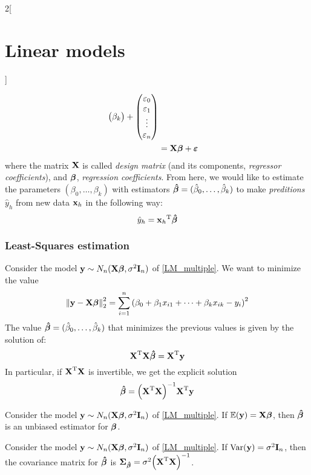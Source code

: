 \documentclass[../../../main_math.tex]{subfiles}
\begin{document}
\begin{multicols}{2}[\section{Linear models}]
\begin{definition}
\begin{align}
\begin{pmatrix}
                     \beta_k \\
                   \end{pmatrix}+
      \begin{pmatrix}
        \varepsilon_0 \\
        \varepsilon_1 \\
        \vdots        \\
        \varepsilon_n \\
      \end{pmatrix}                                                \\
      \label{LM_multiple}      & =\boldsymbol{\mathrm{X}}\boldsymbol{\mathrm{\beta}}+\boldsymbol{\mathrm{\varepsilon}}
    \end{align}
    where the matrix $\boldsymbol{\mathrm{X}}$ is called \emph{design matrix} (and its components, \emph{regressor coefficients}), and $\boldsymbol{\mathrm{\beta}}$, \emph{regression coefficients}. From here, we would like to estimate the parameters $(\beta_0,\ldots,\beta_k)$ with estimators $\boldsymbol{\mathrm{\hat\beta}}=(\hat\beta_0,\ldots,\hat\beta_k)$ to make \emph{preditions} $\hat{y}_h$ from new data $\boldsymbol{\mathrm{x}}_h$ in the following way: $$\hat{y}_h={\boldsymbol{\mathrm{x}}_h}^{\mathrm{T}}\boldsymbol{\mathrm{\hat\beta}}$$
  \end{definition}
  \subsubsection{Least-Squares estimation}
  \begin{proposition}
    Consider the model $\boldsymbol{\mathrm{y}}\sim N_n(\boldsymbol{\mathrm{X\beta}},\sigma^2\boldsymbol{\mathrm{I}}_n)$ of \cref{LM_multiple}. We want to minimize the value $${\left\|\boldsymbol{\mathrm{y}}-\boldsymbol{\mathrm{X\beta}}\right\|}_2^2=\sum_{i=1}^n{\left(\beta_0+\beta_1x_{i1}+\cdots+\beta_kx_{ik}-y_i\right)}^2$$
    The value $\boldsymbol{\mathrm{\hat\beta}}=(\hat\beta_0,\ldots,\hat\beta_k)$ that minimizes the previous values is given by the solution of: $${\boldsymbol{\mathrm{X}}}^{\mathrm{T}}\boldsymbol{\mathrm{X\hat\beta}}={\boldsymbol{\mathrm{X}}}^{\mathrm{T}}\boldsymbol{\mathrm{y}}$$
    In particular, if ${\boldsymbol{\mathrm{X}}}^{\mathrm{T}}\boldsymbol{\mathrm{X}}$ is invertible, we get the explicit solution $$\boldsymbol{\mathrm{\hat\beta}}={\left({\boldsymbol{\mathrm{X}}}^{\mathrm{T}}\boldsymbol{\mathrm{X}}\right)}^{-1}{\boldsymbol{\mathrm{X}}}^{\mathrm{T}}\boldsymbol{\mathrm{y}}$$
  \end{proposition}
  \begin{proposition}
    Consider the model $\boldsymbol{\mathrm{y}}\sim N_n(\boldsymbol{\mathrm{X\beta}},\sigma^2\boldsymbol{\mathrm{I}}_n)$ of \cref{LM_multiple}. If $\mathbb{E}(\boldsymbol{\mathrm{y}})=\boldsymbol{\mathrm{X\beta}}$, then $\boldsymbol{\mathrm{\hat\beta}}$ is an unbiased estimator for $\boldsymbol{\mathrm{\beta}}$.
  \end{proposition}
  \begin{proposition}
    Consider the model $\boldsymbol{\mathrm{y}}\sim N_n(\boldsymbol{\mathrm{X\beta}},\sigma^2\boldsymbol{\mathrm{I}}_n)$ of \cref{LM_multiple}. If $\mathrm{Var}(\boldsymbol{\mathrm{y}})=\sigma^2\boldsymbol{\mathrm{I}}_n$, then the covariance matrix for $\boldsymbol{\mathrm{\hat\beta}}$ is $\boldsymbol{\mathrm{\Sigma}}_{\boldsymbol{\mathrm{\hat\beta}}}=\sigma^2{\left({\boldsymbol{\mathrm{X}}}^{\mathrm{T}}\boldsymbol{\mathrm{X}}\right)}^{-1}$.
  \end{proposition}

\end{multicols}
\end{document}
